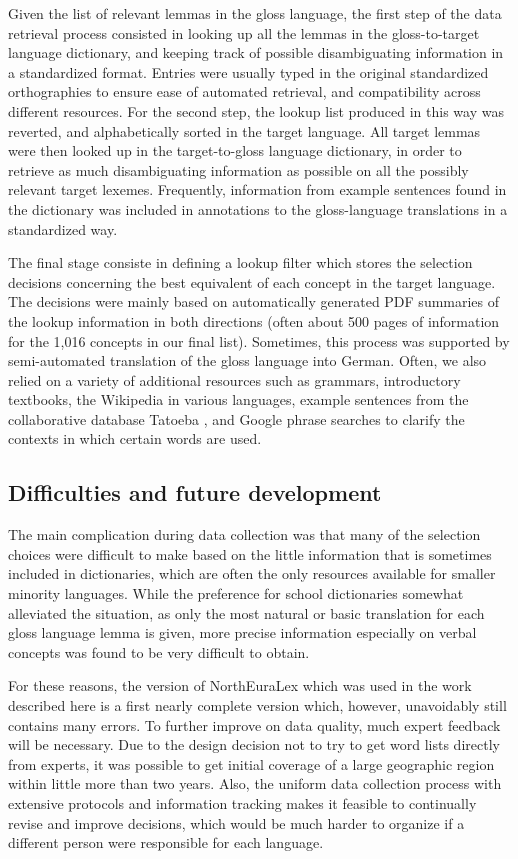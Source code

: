 Given the list of relevant lemmas in the gloss language, the first step of the data retrieval process consisted in looking up all the lemmas in the gloss-to-target language dictionary, and keeping track of possible disambiguating information in a standardized format. Entries were usually typed in the original standardized orthographies to ensure ease of automated retrieval, and compatibility across different resources. For the second step, the lookup list produced in this way was reverted, and alphabetically sorted in the target language. All target lemmas were then looked up in the target-to-gloss language dictionary, in order to retrieve as much disambiguating information as possible on all the possibly relevant target lexemes. Frequently, information from example sentences found in the dictionary was included in annotations to the gloss-language translations in a standardized way.

The final stage consiste in defining a lookup filter which stores the selection decisions concerning the best equivalent of each concept in the target language. The decisions were mainly based on automatically generated PDF summaries of the lookup information in both directions (often about 500 pages of information for the 1,016 concepts in our final list). Sometimes, this process was supported by semi-automated translation of the gloss language into German. Often, we also relied on a variety of additional resources such as grammars, introductory textbooks, the Wikipedia in various languages, example sentences from the collaborative database Tatoeba \citep{tatoeba}, and Google phrase searches to clarify the contexts in which certain words are used.

\subsection{Difficulties and future development}
The main complication during data collection was that many of the selection choices were difficult to make based on the little information that is sometimes included in dictionaries, which are often the only resources available for smaller minority languages. While the preference for school dictionaries somewhat alleviated the situation, as only the most natural or basic translation for each gloss language lemma is given, more precise information especially on verbal concepts was found to be very difficult to obtain.

For these reasons, the version of NorthEuraLex which was used in the work described here is a first nearly complete version which, however, unavoidably still contains many errors. To further improve on data quality, much expert feedback will be necessary. Due to the design decision not to try to get word lists directly from experts, it was possible to get initial coverage of a large geographic region within little more than two years. Also, the uniform data collection process with extensive protocols and information tracking makes it feasible to continually revise and improve decisions, which would be much harder to organize if a different person were responsible for each language.

